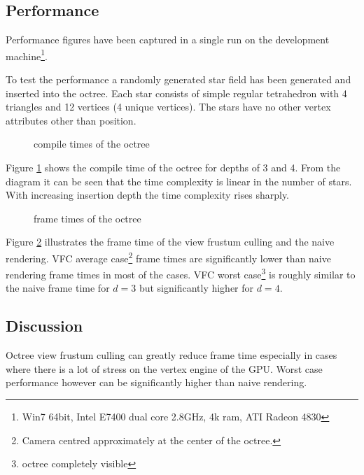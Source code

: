 \documentclass[a4, 12pt]{scrartcl}
\begin{document}
\subsection{Performance}
Performance figures have been captured in a single run on the development machine\footnote{Win7 64bit, Intel E7400 dual core 2.8GHz, 4k ram, ATI Radeon 4830}.

To test the performance a randomly generated star field has been generated and inserted into the octree. Each star consists of simple regular tetrahedron with 4 triangles and 12 vertices (4 unique vertices). The stars have no other vertex attributes  other than position.  


\begin{figure}[hbtp]
\centering
\begin{scriptsize}

\end{scriptsize}
\caption{compile times of the octree}
\label{fig:compile-time}
\end{figure}

Figure \ref{fig:compile-time} shows the compile time of the octree for depths of 3 and 4. From the diagram it can be seen that the time complexity is linear in the number of stars. With increasing insertion depth the time complexity rises sharply. 

\begin{figure}[hbtp]
\centering
\begin{scriptsize}

\end{scriptsize}
\caption{frame times of the octree}
\label{fig:frame-time}
\end{figure}

Figure \ref{fig:frame-time} illustrates the frame time of the view frustum culling and the naive rendering. VFC average case\footnote{Camera centred approximately at the center of the octree.} frame times are significantly lower than naive rendering frame times in most of the cases. VFC worst case\footnote{octree completely visible} is roughly similar to the naive frame time for $d = 3$ but significantly higher for $d = 4$.

\subsection{Discussion}
Octree view frustum culling can greatly reduce frame time especially in cases where there is a lot of stress on the vertex engine of the GPU. Worst case performance however can be significantly higher than naive rendering. 
\end{document}
